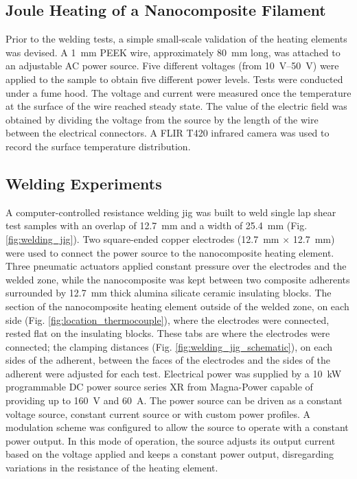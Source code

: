 \documentclass[11pt,review,times]{elsarticle}
\begin{document}
\subsection{Joule Heating of a Nanocomposite Filament}

Prior to the welding tests, a simple small-scale validation of the heating elements was devised. 
A \SI{1}{\milli\metre} PEEK wire, approximately \SI{80}{\milli\metre} long, was attached to an adjustable AC power source. 
Five different voltages (from \SIrange{10}{50}{\volt}) were applied to the sample to obtain five different power levels. 
Tests were conducted under a fume hood. 
The voltage and current were measured once the temperature at the surface of the wire reached steady state. 
The value of the electric field was obtained by dividing the voltage from the source by the length of the wire between the electrical connectors. 
A FLIR T420 infrared camera was used to record the surface temperature distribution. 

\subsection{Welding Experiments}

A computer-controlled resistance welding jig was built to weld single lap shear test samples with an overlap of \SI{12.7}{\milli\metre} and a width of \SI{25.4}{\milli\metre} (Fig. \ref{fig:welding_jig}). 
Two square-ended copper electrodes (\SI{12.7}{\milli\metre} $\times$ \SI{12.7}{\milli\metre}) were used to connect the power source to the nanocomposite heating element. 
Three pneumatic actuators applied constant pressure over the electrodes and the welded zone, while the nanocomposite was kept between two composite adherents surrounded by \SI{12.7}{\milli\metre} thick alumina silicate ceramic insulating blocks. 
The section of the nanocomposite heating element outside of the welded zone, on each side (Fig. \ref{fig:location_thermocouple}), where the electrodes were connected, rested flat on the insulating blocks. 
These tabs are where the electrodes were connected; the clamping distances (Fig. \ref{fig:welding_jig_schematic}), on each sides of the adherent, between the faces of the electrodes and the sides of the adherent were adjusted for each test. 
Electrical power was supplied by a \SI{10}{\kW} programmable DC power source series XR from Magna-Power capable of providing up to \SI{160}{\volt} and \SI{60}{\ampere}. 
The power source can be driven as a constant voltage source, constant current source or with custom power profiles. 
A modulation scheme was configured to allow the source to operate with a constant power output. 
In this mode of operation, the source adjusts its output current based on the voltage applied and keeps a constant power output, disregarding variations in the resistance of the heating element. 
\end{document}
